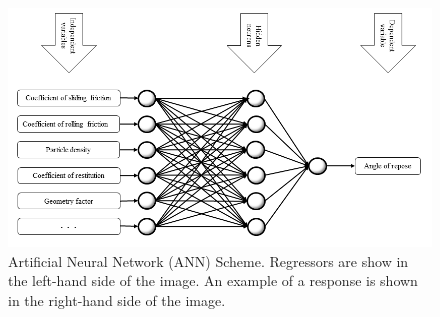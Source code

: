 \begin{figure}[!htb]
\centering
\includegraphics[width=.96\columnwidth]{images/129NN22}
\caption[ANN Scheme]{Artificial Neural Network (\acs{ANN}) Scheme. Regressors
are show in the left-hand side of the image. An example of a response is shown
in the right-hand side of the image.}
\label{fig:018nnscheme}
\end{figure}